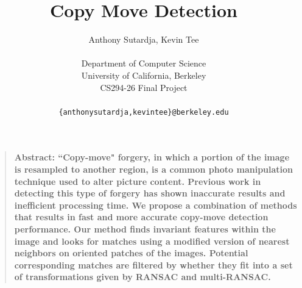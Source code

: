 \documentclass[12pt]{article}
\title{Copy Move Detection}
\author
{Anthony Sutardja, Kevin Tee\\
\\
\normalsize{Department of Computer Science}\\
\normalsize{University of California, Berkeley}\\
\normalsize{CS294-26 Final Project}\\
\\
\normalsize\texttt{\{anthonysutardja,kevintee\}@berkeley.edu} 
}
\date{}
\newenvironment{sciabstract}{%
\begin{quote} \bf}
{\end{quote}}
\begin{document}
 


\baselineskip24pt
\setlength{\parskip}{1em}
\setlength{\parindent}{0em}

\maketitle 




\begin{sciabstract}
Abstract: ``Copy-move" forgery, in which a portion of the image is resampled to another region, is a common photo manipulation technique used to alter picture content. Previous work in detecting this type of forgery has shown inaccurate results and inefficient processing time. We propose a combination of methods that results in fast and more accurate copy-move detection performance. Our method finds invariant features within the image and looks for matches using a modified version of nearest neighbors on oriented patches of the images. Potential corresponding matches are filtered by whether they fit into a set of transformations given by RANSAC and multi-RANSAC.
\end{sciabstract}

\end{document}
